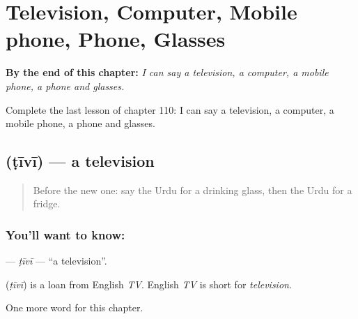
\chapter{Television, Computer, Mobile phone, Phone, Glasses}
\label{ch:ur-television-computer-mobile-phone-phone-glasses}

\begin{chapteropening}
\textbf{By the end of this chapter:} \emph{I can say a television, a computer, a mobile phone, a phone and glasses.}

Complete the last lesson of chapter 110: I can say a television, a computer, a mobile phone, a phone and glasses.
\end{chapteropening}

\section[\texorpdfstring{\ur{ٹی} \ur{وی} (ṭīvī)}{ٹی وی (ṭīvī)}]{  (ṭīvī) — a television}

\label{lesson:UR-C110-tivi}



\begin{quote}
Before the new one: say the Urdu for a drinking glass, then the Urdu for a fridge.
\end{quote}

\subsection*{You'll want to know:  }
\textbf{ } — \emph{ṭīvī} — \textquotedblleft{}a television\textquotedblright{}.

\begin{cousinweb}
\textbf{ } (\emph{ṭīvī}) is a loan from English \emph{TV}. English \emph{TV} is short for \emph{television}.
\end{cousinweb}

\begin{grammarlens}[title={What you've built}]
One more word for this chapter.
\end{grammarlens}

